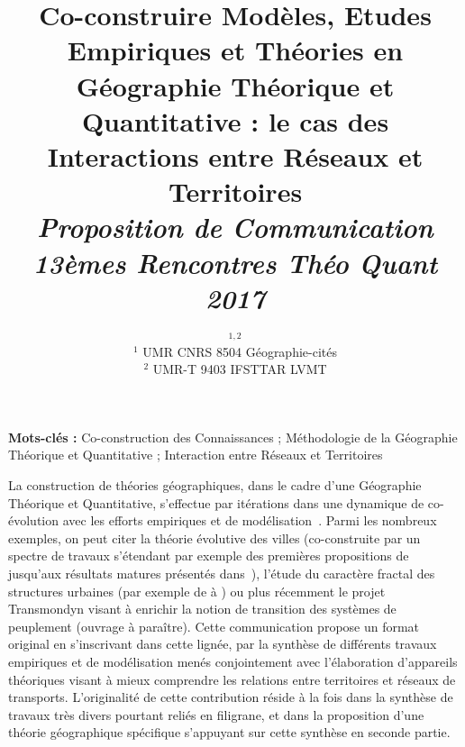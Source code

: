 




\title{Co-construire Modèles, Etudes Empiriques et Théories en Géographie Théorique et Quantitative : le cas des Interactions entre Réseaux et Territoires\\\bigskip
\textit{Proposition de Communication\\ 13èmes Rencontres Théo Quant 2017}\\\bigskip
}
\author{$^{1,2}$\\
$^1$ UMR CNRS 8504 Géographie-cités\\
$^2$ UMR-T 9403 IFSTTAR LVMT
}
\date{}

\maketitle

\justify


\begin{abstract}
\end{abstract}


\textbf{Mots-clés : } Co-construction des Connaissances ; Méthodologie de la Géographie Théorique et Quantitative ; Interaction entre Réseaux et Territoires

\bigskip


La construction de théories géographiques, dans le cadre d'une Géographie Théorique et Quantitative, s'effectue par itérations dans une dynamique de co-évolution avec les efforts empiriques et de modélisation~\cite{livet2010}. Parmi les nombreux exemples, on peut citer la théorie évolutive des villes (co-construite par un spectre de travaux s'étendant par exemple des premières propositions de \cite{pumain1997pour} jusqu'aux résultats matures présentés dans~\cite{pumain2012multi}), l'étude du caractère fractal des structures urbaines (par exemple de \cite{frankhauser1998fractal} à \cite{frankhauser2008fractal}) ou plus récemment le projet Transmondyn visant à enrichir la notion de transition des systèmes de peuplement (ouvrage à paraître). Cette communication propose un format original en s'inscrivant dans cette lignée, par la synthèse de différents travaux empiriques et de modélisation menés conjointement avec l'élaboration d'appareils théoriques visant à mieux comprendre les relations entre territoires et réseaux de transports. L'originalité de cette contribution réside à la fois dans la synthèse de travaux très divers pourtant reliés en filigrane, et dans la proposition d'une théorie géographique spécifique s'appuyant sur cette synthèse en seconde partie.



